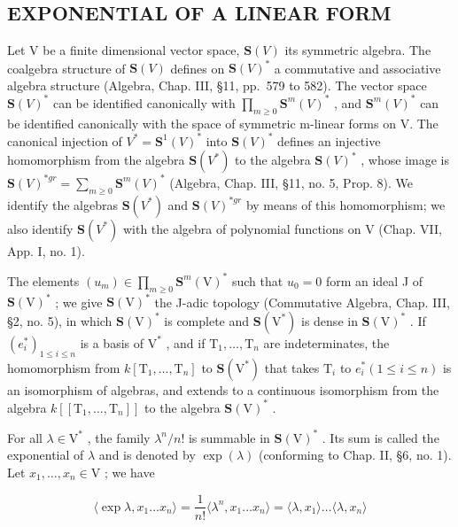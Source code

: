 \subsection{EXPONENTIAL OF A LINEAR FORM}

Let V be a finite dimensional vector space, \(\mathbf{S}(V)\) its symmetric algebra. The coalgebra structure of \(\mathbf{S}(V)\) defines on \(\mathbf{S}(V)^{*}\) a commutative and associative algebra structure (Algebra, Chap. III, §11, pp.~579 to 582). The vector space \(\mathbf{S}(V)^{*}\) can be identified canonically with \(\prod_{m\geq0}\mathbf{S}^{m}(V)^{*}\) , and \(\mathbf{S}^{m}(V)^{*}\) can be identified canonically with the space of symmetric m-linear forms on V. The canonical injection of \(V^{*}=\mathbf{S}^{1}(V)^{*}\) into \(\mathbf{S}(V)^{*}\) defines an injective homomorphism from the algebra \(\mathbf{S}(V^{*})\) to the algebra \(\mathbf{S}(V)^{*}\) , whose image is \(\mathbf{S}(V)^{*gr}=\sum_{m\geq0}\mathbf{S}^{m}(V)^{*}\) (Algebra, Chap. III, §11, no. 5, Prop. 8). We identify the algebras \(\mathbf{S}(V^{*})\) and \(\mathbf{S}(V)^{*gr}\) by means of this homomorphism; we also identify \(\mathbf{S}(V^{*})\) with the algebra of polynomial functions on V (Chap. VII, App. I, no. 1).

The elements \((u_m) \in \prod_{m \geq 0} \mathbf{S}^m(\mathrm{V})^*\) such that \(u_0 = 0\) form an ideal J of \(\mathbf{S}(\mathrm{V})^*\) ; we give \(\mathbf{S}(\mathrm{V})^*\) the J-adic topology (Commutative Algebra, Chap. III, §2, no. 5), in which \(\mathbf{S}(\mathrm{V})^*\) is complete and \(\mathbf{S}(\mathrm{V}^*)\) is dense in \(\mathbf{S}(\mathrm{V})^*\) . If \((e_i^*)_{1 \leq i \leq n}\) is a basis of \(\mathrm{V}^*\) , and if \(\mathrm{T}_1, \ldots, \mathrm{T}_n\) are indeterminates, the homomorphism from \(k[\mathrm{T}_1, \ldots, \mathrm{T}_n]\) to \(\mathbf{S}(\mathrm{V}^*)\) that takes \(\mathrm{T}_i\) to \(e_i^*(1 \leq i \leq n)\) is an isomorphism of algebras, and extends to a continuous isomorphism from the algebra \(k[[\mathrm{T}_1, \ldots, \mathrm{T}_n]]\) to the algebra \(\mathbf{S}(\mathrm{V})^*\) .

For all \(\lambda \in \mathrm{V}^*\) , the family \(\lambda^n / n!\) is summable in \(\mathbf{S}(\mathrm{V})^*\) . Its sum is called the exponential of \(\lambda\) and is denoted by \(\exp(\lambda)\) (conforming to Chap. II, §6, no. 1). Let \(x_1, \ldots, x_n \in \mathrm{V}\) ; we have

\[
\langle \exp \lambda , x _ {1} \dots x _ {n} \rangle = \frac {1}{n !} \langle \lambda^ {n}, x _ {1} \dots x _ {n} \rangle = \langle \lambda , x _ {1} \rangle \dots \langle \lambda , x _ {n} \rangle
\]


